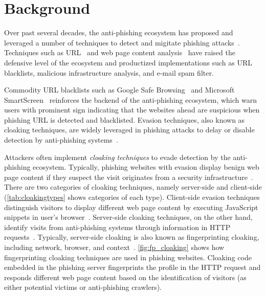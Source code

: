 \section{Background}
\label{s:background}

\cloakingTypes



Over past several decades, the anti-phishing ecosystem has proposed and leveraged a number of techniques to detect and migitate phishing attacks~\cite{oest2018inside}.
Techniques such as URL~\cite{bin2010dns, blum2010lexical, huang2012svm, khonji2011novel} and web page content analysis~\cite{wu2006web, zhang2007cantina, zhang2011textual, bilge2011exposure, canali2013role} have raised the defensive level of the ecosystem and productized implementations such as URL blacklists, malicious infrastructure analysis, and e-mail spam filter.

Commodity URL blacklists such as Google Safe Browsing~\cite{whittaker2010large} and Microsoft SmartScreen~\cite{smartscreen} reinforces the backend of the anti-phishing ecosystem, which warn users with prominent sign indicating that the websites ahead are suspicious when phishing URL is detected and blacklisted.
Evasion techniques, also known as cloaking techniques, are widely leveraged in phishing attacks to delay or disable detection by anti-phishing systems~\cite{liang2016cracking, oest2019phishfarm, oest2020phishtime}.



Attackers often implement \emph{cloaking techniques} to evade detection by the anti-phishing ecosystem.
Typically, phishing websites with evasion display benign web page content if they suspect the visit originates from a security infrastructure~\cite{wu2005cloaking}.
There are two categories of cloaking techniques, namely server-side and client-side (\autoref{tab:cloakingtypes} shows categories of each type).
Client-side evasion techniques distinguish visitors to display different web page content by executing JavaScript snippets in user's browser~\cite{zhang2021crawlphish}.
Server-side cloaking techniques, on the other hand, identify visits from anti-phishing systems through information in HTTP requests~\cite{oest2018inside, invernizzi2016cloak}.
Typically, server-side cloaking is also known as fingerprinting cloaking, including network, browser, and context~\cite{invernizzi2016cloak}.
\autoref{fig:fp_cloaking} shows how fingerprinting cloaking techniques are used in phishing websites.
Cloaking code embedded in the phishing server fingerprints the profile in the HTTP request and responds different web page content based on the identification of visitors (as either potential victims or anti-phishing crawlers).

